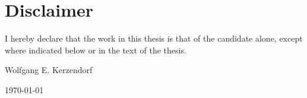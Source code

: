 \section*{Disclaimer}

I hereby declare that the work in this thesis is that of the candidate
alone, except where indicated below or in the text of the thesis.

\vspace{3cm}
\begin{flushright}
Wolfgang E. Kerzendorf

\today
\end{flushright}

